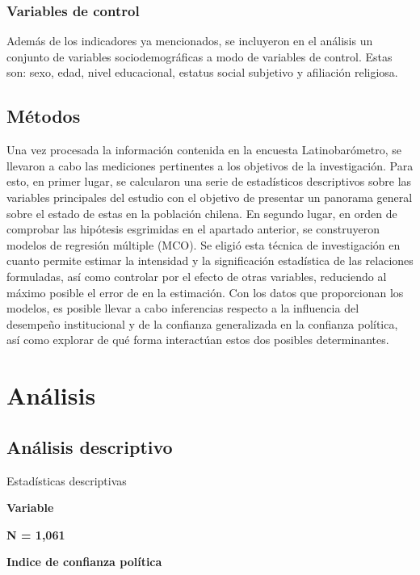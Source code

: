 \documentclass[12pt,twoside]{templates/facsothesis}
\begin{document}
\subsection{Variables de control}\label{variables-de-control}

Además de los indicadores ya mencionados, se incluyeron en el análisis un conjunto de variables sociodemográficas a modo de variables de control. Estas son: sexo, edad, nivel educacional, estatus social subjetivo y afiliación religiosa.

\section{Métodos}\label{muxe9todos}

Una vez procesada la información contenida en la encuesta Latinobarómetro, se llevaron a cabo las mediciones pertinentes a los objetivos de la investigación. Para esto, en primer lugar, se calcularon una serie de estadísticos descriptivos sobre las variables principales del estudio con el objetivo de presentar un panorama general sobre el estado de estas en la población chilena. En segundo lugar, en orden de comprobar las hipótesis esgrimidas en el apartado anterior, se construyeron modelos de regresión múltiple (MCO). Se eligió esta técnica de investigación en cuanto permite estimar la intensidad y la significación estadística de las relaciones formuladas, así como controlar por el efecto de otras variables, reduciendo al máximo posible el error de en la estimación. Con los datos que proporcionan los modelos, es posible llevar a cabo inferencias respecto a la influencia del desempeño institucional y de la confianza generalizada en la confianza política, así como explorar de qué forma interactúan estos dos posibles determinantes.

\chapter{Análisis}\label{anuxe1lisis}

\section{Análisis descriptivo}\label{anuxe1lisis-descriptivo}

\label{tab:tabla-1}Estadísticas descriptivas

\textbf{Variable}

\textbf{N = 1,061}

\textbf{Indice de confianza política}
\end{document}
